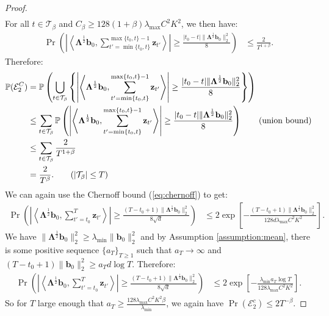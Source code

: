 \begin{proof}
\begin{align*}
\end{align*}
For all $t \in \mathcal{T}_{\beta}$ and $C_\beta \geq 128(1+\beta)\lambda_{\max}C^2K^2$, we then have: 
\begin{align*}
    \Pr\left(\left|\left\langle\boldsymbol{\Lambda}^{\frac{1}{2}}\mathbf{b}_0, \sum_{t'=\min\{t_0,t\}}^{\max\{t_0,t\}-1}\mathbf{z}_{t'} \right\rangle\right| \geq \frac{|t_0-t| \lVert\boldsymbol{\Lambda}^{\frac{1}{2}} \mathbf{b}_0\rVert_2^2}{8}\right) &\leq \frac{2}{T^{1+\beta}}.
\end{align*}
Therefore:
\begin{align*}
    \Pr(\mathcal{E}^C_2) &= \Pr\left(\bigcup_{t \in \mathcal{T}_{\beta}} \left\{\left|\left\langle\boldsymbol{\Lambda}^{\frac{1}{2}}\mathbf{b}_0, \sum_{t'=\min\{t_0,t\}}^{\max\{t_0,t\}-1}\mathbf{z}_{t'} \right\rangle\right| \geq \frac{|t_0-t| \lVert\boldsymbol{\Lambda}^{\frac{1}{2}} \mathbf{b}_0\rVert_2^2}{8}\right\} \right) \\
    &\leq \sum_{t \in \mathcal{T}_{\beta}}\Pr\left(\left|\left\langle\boldsymbol{\Lambda}^{\frac{1}{2}}\mathbf{b}_0, \sum_{t'=\min\{t_0,t\}}^{\max\{t_0,t\}-1}\mathbf{z}_{t'} \right\rangle\right| \geq \frac{|t_0-t| \lVert\boldsymbol{\Lambda}^{\frac{1}{2}} \mathbf{b}_0\rVert_2^2}{8}\right)\tag{union bound} \\
    &\leq \sum_{t \in \mathcal{T}_{\beta}} \frac{2}{T^{1+\beta}} \\
    &= \frac{2}{T^\beta}.\tag{$| \mathcal{T}_{\beta}| \leq T$} 
\end{align*}
We can again use the Chernoff bound (\ref{eq:chernoff}) to get: 
\begin{align*}
    \Pr\left(\left|\left\langle\boldsymbol{\Lambda}^{\frac{1}{2}}\mathbf{b}_0, \sum_{t'=t_0}^T \mathbf{z}_{t'} \right\rangle\right| \geq \frac{(T-t_0+1) \lVert\boldsymbol{\Lambda}^{\frac{1}{2}} \mathbf{b}_0\rVert_2^2}{8\sqrt{d}}\right) &\leq 2\exp\left[-\frac{(T-t_0+1)\lVert\boldsymbol{\Lambda}^{\frac{1}{2}} \mathbf{b}_0\rVert^2_2}{128d\lambda_{\max}C^2K^2}\right].
\end{align*}
We have $\lVert\boldsymbol{\Lambda}^{\frac{1}{2}} \mathbf{b}_0\rVert^2_2 \geq \lambda_{\min} \lVert \mathbf{b}_0\rVert^2_2$ and by Assumption \ref{assumption:mean}, there is some positive sequence $\{a_T\}_{T\geq1}$ such that $a_T \to \infty$ and $(T-t_0+1)\lVert \mathbf{b}_0\rVert^2_2 \geq a_Td\log T$. Therefore:
\begin{align*}
    \Pr\left(\left|\left\langle\boldsymbol{\Lambda}^{\frac{1}{2}}\mathbf{b}_0, \sum_{t'=t_0}^T \mathbf{z}_{t'} \right\rangle\right| \geq \frac{(T-t_0+1) \lVert\boldsymbol{\Lambda}^{\frac{1}{2}} \mathbf{b}_0\rVert_2^2}{8\sqrt{d}}\right) &\leq 2\exp\left[-\frac{\lambda_{\min} a_T\log T}{128\lambda_{\max}C^2K^2}\right].
\end{align*}
So for $T$ large enough that $a_T \geq\frac{128\lambda_{\max}C^2K^2 \beta}{\lambda_{\min}}$, we again have $\Pr(\mathcal{E}_2^c) \leq 2T^{-\beta}$.


\end{proof}

